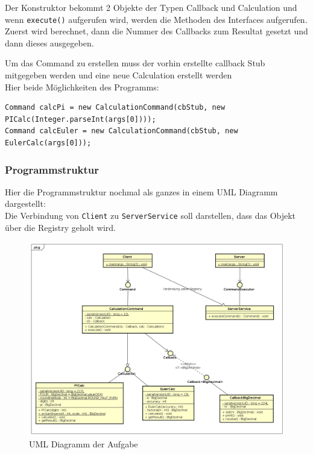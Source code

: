Der Konstruktor bekommt 2 Objekte der Typen Callback und Calculation und wenn \texttt{execute()} aufgerufen wird, werden die Methoden des Interfaces aufgerufen.
Zuerst wird berechnet, dann die Nummer des Callbacks zum Resultat gesetzt und dann dieses ausgegeben.

Um das Command zu erstellen muss der vorhin erstellte callback Stub mitgegeben werden und eine neue Calculation erstellt werden\\
Hier beide M\"oglichkeiten des Programms:

\begin{lstlisting}[style=Java, caption=Command Erstellung]
Command calcPi = new CalculationCommand(cbStub, new PICalc(Integer.parseInt(args[0])));
Command calcEuler = new CalculationCommand(cbStub, new EulerCalc(args[0]));
\end{lstlisting}

\subsubsection{Programmstruktur}

Hier die Programmstruktur nochmal als ganzes in einem UML Diagramm dargestellt:\\
Die Verbindung von \texttt{Client} zu \texttt{ServerService} soll darstellen, dass das Objekt \"uber die Registry geholt wird.

\begin{figure}[!h]
        \begin{center}
                \includegraphics[width=\linewidth]{images/commandPatternUML.png}
                \caption{UML Diagramm der Aufgabe}
        \end{center}
\end{figure}

